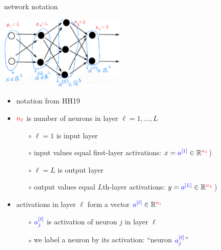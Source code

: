 \documentclass[xcolor={svgnames},
               hyperref={colorlinks,citecolor=DeepPink4,linkcolor=FireBrick,urlcolor=Maroon}]
               {beamer}
\newcommand{\RR}{\mathbb{R}}
\begin{document}
\begin{frame}{network notation}

\begin{center}
\includegraphics[height=35mm]{figs/state-notation}
\end{center}

\begin{itemize}
\item notation from HH19
\item ${\color{red} n_\ell}$ is number of neurons in layer $\ell=1,\dots,L$
    \begin{itemize}
    \item[$\circ$] $\ell=1$ is \alert{input} layer
    \item[$\circ$] input values equal first-layer activations: $x = {\color{blue} a^{[1]}} \in \RR^{{\color{red} n_1}}$)
    \item[$\circ$] $\ell=L$ is \alert{output} layer
    \item[$\circ$] output values equal $L$th-layer activations: $y = {\color{blue} a^{[L]}} \in \RR^{{\color{red} n_L}}$)
    \end{itemize}
\item activations in layer $\ell$ form a vector ${\color{blue} a^{[\ell]}} \in \RR^{{\color{red} n_\ell}}$
    \begin{itemize}
    \item[$\circ$] ${\color{blue} a_j^{[\ell]}}$ is activation of neuron $j$ in layer $\ell$
    \item[$\circ$] we label a neuron by its activation: ``neuron ${\color{blue} a_j^{[\ell]}}$''
    \end{itemize}
\end{itemize}
\end{frame}
\end{document}
